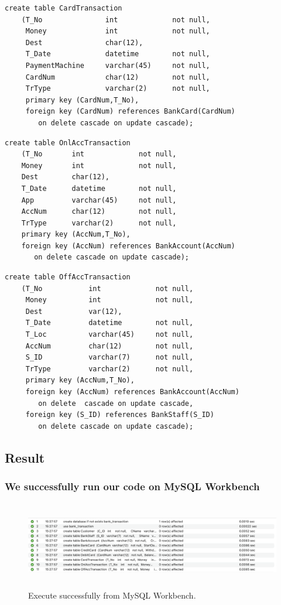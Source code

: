 \documentclass[12pt,a4paper]{article}
\begin{document}
\begin{verbatim}
create table CardTransaction
    (T_No               int             not null,
     Money              int             not null,
     Dest               char(12),
     T_Date             datetime        not null,
     PaymentMachine     varchar(45)     not null,
     CardNum            char(12)        not null,
     TrType             varchar(2)      not null,
     primary key (CardNum,T_No),
     foreign key (CardNum) references BankCard(CardNum) 
        on delete cascade on update cascade);
\end{verbatim}

\begin{verbatim}
create table OnlAccTransaction
    (T_No       int             not null,
    Money       int             not null,
    Dest        char(12),
    T_Date      datetime        not null,
    App         varchar(45)     not null,
    AccNum      char(12)        not null,
    TrType      varchar(2)      not null,
    primary key (AccNum,T_No),
    foreign key (AccNum) references BankAccount(AccNum) 
       on delete cascade on update cascade);
\end{verbatim}


\begin{verbatim}
create table OffAccTransaction
    (T_No           int             not null,
     Money          int             not null,
     Dest           var(12),
     T_Date         datetime        not null,
     T_Loc          varchar(45)     not null,
     AccNum         char(12)        not null,
     S_ID           varchar(7)      not null,
     TrType         varchar(2)      not null,
     primary key (AccNum,T_No),
     foreign key (AccNum) references BankAccount(AccNum) 
        on delete  cascade on update cascade,
     foreign key (S_ID) references BankStaff(S_ID) 
        on delete cascade on update cascade);

\end{verbatim}
\newpage
\subsection{Result}
\subsubsection{We successfully run our code on MySQL Workbench} 
\begin{figure}[H]
    \centering
    \includegraphics[width=5.5in,height=1.5in]{Picture/result1.png}
    \caption{Execute successfully from MySQL Workbench.}
\end{figure}
\end{document}
